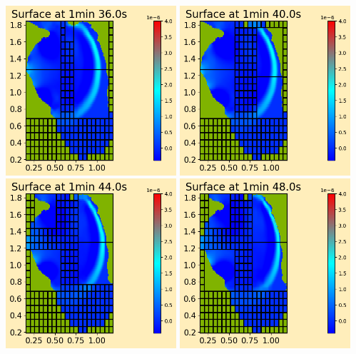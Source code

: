 \documentclass[11pt]{article}
\begin{document}
\vskip 10pt 
\includegraphics[width=0.475\textwidth]{frame0024fig0.png}
\vskip 10pt 
\includegraphics[width=0.475\textwidth]{frame0025fig0.png}
\vskip 10pt 
\includegraphics[width=0.475\textwidth]{frame0026fig0.png}
\vskip 10pt 
\includegraphics[width=0.475\textwidth]{frame0027fig0.png}
\end{document}
